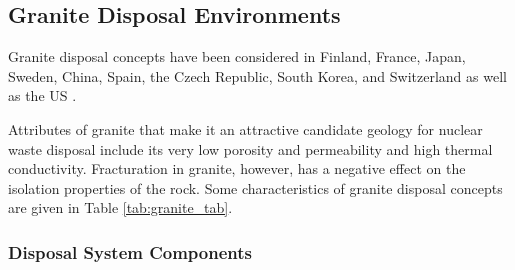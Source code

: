 
% 


\subsection{Granite Disposal Environments}

Granite disposal concepts have been considered in Finland, France, Japan, 
Sweden, China,  Spain, the Czech Republic, South Korea, and Switzerland 
\cite{andra_granite:_2005, von_lensa_red-impact_2008} as well as the \gls{US} 
\cite{hardin_generic_2011}.

Attributes of granite that make it an attractive candidate geology for nuclear 
waste disposal include its very low porosity and permeability and high thermal 
conductivity. Fracturation in granite, however, has a negative effect on the 
isolation properties of the rock.
Some characteristics of granite disposal 
concepts are given in Table \ref{tab:granite_tab}.   



\subsubsection{Disposal System Components}

